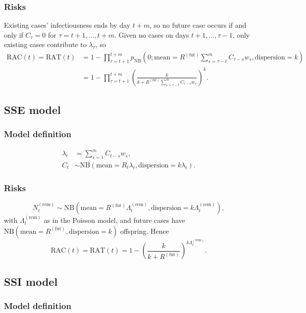 \documentclass{article}
\newcommand{\NBDist}[2]{\mathrm{NB}\left(\mathrm{mean}=#1,
\mathrm{dispersion}=#2\right)}
\newcommand{\Rfut}{R^{(\mathrm{fut})}}
\newcommand{\RAC}{\mathrm{RAC}}
\newcommand{\RAT}{\mathrm{RAT}}
\newcommand{\NBPMF}[3]{p_{\mathrm{NB}}\left(#1; \mathrm{mean}=#2,
\mathrm{dispersion}=#3\right)}
\begin{document}
\subsubsection{Risks}

Existing cases' infectiousness ends by day \(t+m\), so no future case
occurs if and only if \(C_\tau=0\) for \(\tau=t+1,\ldots,t+m\). Given no
cases on days \(t+1,\ldots,\tau-1\), only existing cases contribute to
\(\lambda_\tau\), so
\begin{align}
  \nonumber\RAC(t)=\RAT(t)
  &=1-\prod_{\tau=t+1}^{t+m}\NBPMF{0}{\Rfut\sum_{s=\tau-t}^{m}
  C_{\tau-s} w_s}{k}\\
  &=1-\prod_{\tau=t+1}^{t+m}{\left(\frac{k}{k+\Rfut\sum_{s=\tau-t}^{m}
  C_{\tau-s} w_s}\right)}^{k}.
\end{align}

\subsection{SSE model}
\subsubsection{Model definition}

\begin{align}
  \lambda_{t} &= \sum_{s=1}^{m} C_{t-s} w_s,\\
  C_t &\sim \NBDist{R_{t}\lambda_{t}}{k\lambda_{t}}.
\end{align}

\subsubsection{Risks}

\begin{equation}
  N^{(\mathrm{rem})}_{t} \sim
  \NBDist{\Rfut\Lambda^{(\mathrm{rem})}_{t}}{k\Lambda^{(\mathrm{rem})}_{t}},
\end{equation}
with \(\Lambda^{(\mathrm{rem})}_{t}\) as in the Poisson model, and future
cases have \(\NBDist{\Rfut}{k}\) offspring. Hence
\begin{equation}
  \RAC(t)=\RAT(t)=
  1-{\left(\frac{k}{k+\Rfut}\right)}^{k\Lambda^{(\mathrm{rem})}_{t}}.
\end{equation}

\subsection{SSI model}
\subsubsection{Model definition}
\end{document}
